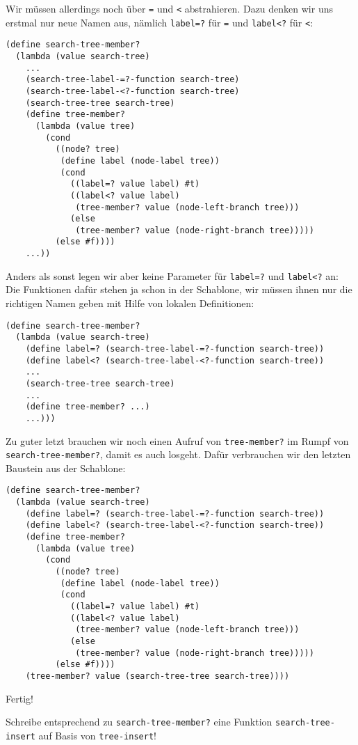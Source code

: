 %
Wir müssen allerdings noch über \lstinline{=} und \lstinline{<}
abstrahieren.  Dazu denken wir uns erstmal nur neue Namen aus, nämlich
\lstinline{label=?} für \lstinline{=} und \lstinline{label<?} für \lstinline{<}:
%
\begin{lstlisting}
(define search-tree-member?
  (lambda (value search-tree)
    ...
    (search-tree-label-=?-function search-tree)
    (search-tree-label-<?-function search-tree)
    (search-tree-tree search-tree)
    (define tree-member?
      (lambda (value tree)
        (cond
          ((node? tree)
           (define label (node-label tree))
           (cond
             ((label=? value label) #t)
             ((label<? value label)
              (tree-member? value (node-left-branch tree)))
             (else
              (tree-member? value (node-right-branch tree)))))
          (else #f))))
    ...))
\end{lstlisting}
%
Anders als sonst legen wir aber keine Parameter für
\lstinline{label=?} und \lstinline{label<?} an: Die Funktionen
dafür stehen ja schon in der Schablone, wir müssen ihnen nur die
richtigen Namen geben mit Hilfe von lokalen Definitionen:
%
\begin{lstlisting}
(define search-tree-member?
  (lambda (value search-tree)
    (define label=? (search-tree-label-=?-function search-tree))
    (define label<? (search-tree-label-<?-function search-tree))
    ...
    (search-tree-tree search-tree)
    ...
    (define tree-member? ...)
    ...)))
\end{lstlisting}
%
Zu guter letzt brauchen wir noch einen Aufruf von \lstinline{tree-member?}
im Rumpf von \lstinline{search-tree-member?}, damit es auch losgeht.
Dafür verbrauchen wir den letzten Baustein aus der Schablone:
%
\begin{lstlisting}
(define search-tree-member?
  (lambda (value search-tree)
    (define label=? (search-tree-label-=?-function search-tree))
    (define label<? (search-tree-label-<?-function search-tree))
    (define tree-member?
      (lambda (value tree)
        (cond
          ((node? tree)
           (define label (node-label tree))
           (cond
             ((label=? value label) #t)
             ((label<? value label)
              (tree-member? value (node-left-branch tree)))
             (else
              (tree-member? value (node-right-branch tree)))))
          (else #f))))
    (tree-member? value (search-tree-tree search-tree))))
\end{lstlisting}
%
Fertig!

\begin{aufgabeinline}
  Schreibe entsprechend zu \lstinline{search-tree-member?} eine
  Funktion \lstinline{search-tree-insert} auf Basis von
  \lstinline{tree-insert}!
\end{aufgabeinline}

